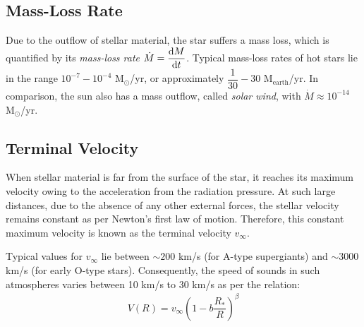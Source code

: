         \subsection{Mass-Loss Rate} \label{tool:stellar-winds:mass-loss}
        	Due to the outflow of stellar material, the star suffers a mass loss, which is quantified by its \emph{mass-loss rate} $\dot{M}=\dfrac{\mathrm{d}M}{\mathrm{d}t}$. Typical mass-loss rates of hot stars lie in the range $10^{-7}-10^{-4}$ M$_\odot$/yr, or approximately $\dfrac{1}{30}-30$ M$_\text{earth}$/yr. In comparison, the sun also has a mass outflow, called \emph{solar wind}, with $\dot{M}\approx 10^{-14}$ M$_\odot$/yr.
        
        \subsection{Terminal Velocity} \label{tool:stellar-winds:term-vel}
        	When stellar material is far from the surface of the star, it reaches its maximum velocity owing to the acceleration from the radiation pressure. At such large distances, due to the absence of any other external forces, the stellar velocity remains constant as per Newton's first law of motion. Therefore, this constant maximum velocity is known as the terminal velocity $v_\infty$.
        	
        	Typical values for $v_\infty$ lie between $\sim 200$ km/s (for A-type supergiants) and $\sim 3000$ km/s (for early O-type stars). Consequently, the speed of sounds in such atmospheres varies between 10 km/s to 30 km/s as per the relation:
        	\begin{align*}
        		V(R)=v_\infty\left(1-b\dfrac{R_*}{R}\right)^\beta
        	\end{align*}
	
